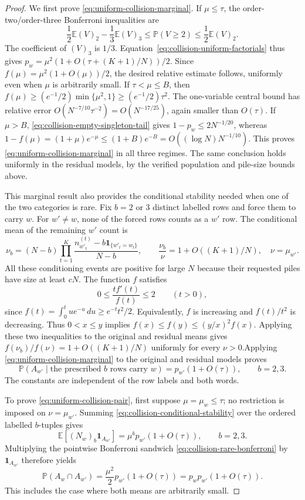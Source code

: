 \documentclass[11pt]{article}
\numberwithin{equation}{section}
\theoremstyle{definition}
\theoremstyle{remark}
\newcommand{\E}{\mathbb E}
\newcommand{\Pp}{\mathbb P}
\newcommand{\1}{\mathbf 1}
\begin{document}
\begin{proof}
We first prove \eqref{eq:uniform-collision-marginal}.
If $\mu\le\tau$, the order-two/order-three Bonferroni inequalities are
\begin{equation}
\label{eq:collision-rare-bonferroni}
 \frac12\E(V)_2-\frac13\E(V)_3
 \le\Pp(V\ge2)\le\frac12\E(V)_2.
\end{equation}
The coefficient of $(V)_3$ is $1/3$.
Equation~\eqref{eq:collision-uniform-factorials} thus gives
$p_w=\mu^2(1+O(\tau+(K+1)/N))/2$.
Since $f(\mu)=\mu^2(1+O(\mu))/2$, the desired relative estimate follows,
uniformly even when $\mu$ is arbitrarily small.
If $\tau<\mu\le B$, then $f(\mu)\ge(e^{-1}/2)\min\{\mu^2,1\}\ge(e^{-1}/2)\tau^2$.
The one-variable central bound has relative error
$O(N^{-7/10}\tau^{-2})=O(N^{-17/25})$, again smaller than $O(\tau)$.
If $\mu>B$, \eqref{eq:collision-empty-singleton-tail} gives
$1-p_w\le2N^{-1/20}$, whereas
$1-f(\mu)=(1+\mu)e^{-\mu}\le(1+B)e^{-B}=O((\log N)N^{-1/10})$.
This proves \eqref{eq:uniform-collision-marginal} in all three regimes.
The same conclusion holds uniformly in the residual models, by the verified
population and pile-size bounds above.

This marginal result also provides the conditional stability needed when
one of the two categories is rare. Fix $b=2$ or $3$ distinct labelled rows
and force them to carry $w$. For $w'\ne w$, none of the forced rows counts
as a $w'$ row. The conditional mean of the remaining $w'$ count is
\[
 \nu_b=(N-b)\prod_{t=1}^{K}
 \frac{n_{w'_t}^{(t)}-b\mathbf 1_{\{w'_t=w_t\}}}{N-b},
 \qquad \frac{\nu_b}{\nu}=1+O((K+1)/N),\quad\nu=\mu_{w'}.
\]
All these conditioning events are positive for large $N$ because their
requested piles have size at least $cN$. The function $f$ satisfies
\[
 0\le\frac{tf'(t)}{f(t)}\le2\qquad(t>0),
\]
since $f(t)=\int_0^t u e^{-u}\,du\ge e^{-t}t^2/2$.
Equivalently, $f$ is increasing and $f(t)/t^2$ is decreasing. Thus
$0<x\le y$ implies $f(x)\le f(y)\le(y/x)^2f(x)$. Applying these two
inequalities to the original and residual means gives
$f(\nu_b)/f(\nu)=1+O((K+1)/N)$ uniformly for every $\nu>0$.Applying \eqref{eq:uniform-collision-marginal} to the original and residual
models proves
\begin{equation}
\label{eq:collision-conditional-stability}
 \Pp(A_{w'}\mid\text{the prescribed $b$ rows carry $w$})
 =p_{w'}(1+O(\tau)),\qquad b=2,3.
\end{equation}
The constants are independent of the row labels and both words.

To prove \eqref{eq:uniform-collision-pair}, first suppose
$\mu=\mu_w\le\tau$; no restriction is imposed on $\nu=\mu_{w'}$.
Summing \eqref{eq:collision-conditional-stability} over the ordered labelled
$b$-tuples gives
\[
 \E[(N_w)_b\mathbf 1_{A_{w'}}]
 =\mu^b p_{w'}(1+O(\tau)),\qquad b=2,3.
\]
Multiplying the pointwise Bonferroni sandwich
\eqref{eq:collision-rare-bonferroni} by $\mathbf 1_{A_{w'}}$ therefore yields
\[
 \Pp(A_w\cap A_{w'})=\frac{\mu^2}2p_{w'}(1+O(\tau))
 =p_wp_{w'}(1+O(\tau)).
\]
This includes the case where both means are arbitrarily small.


\end{proof}
\end{document}
